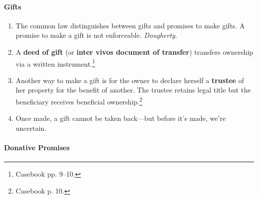 \paragraph{Gifts}

\begin{enumerate}
    \item The common law distinguishes between gifts and promises to make 
    gifts. A promise to make a gift is not enforceable. \emph{Dougherty}.
    \item A \textbf{deed of gift} (or \textbf{inter vivos document of 
    transfer}) transfers ownership via a written instrument.\footnote{Casebook 
    pp. 9--10.}
    \item Another way to make a gift is for the owner to declare herself a 
    \textbf{trustee} of her property for the benefit of another. The trustee 
    retains legal title but the beneficiary receives beneficial 
    ownership.\footnote{Casebook p. 10.}
    \item Once made, a gift cannot be taken back---but before it's made, we're 
    uncertain.
\end{enumerate}

\paragraph{Donative Promises}

